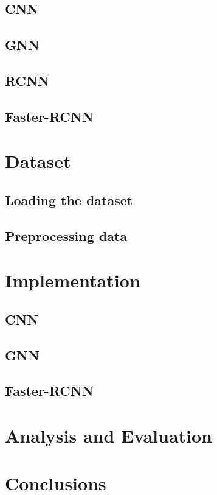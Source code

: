 \documentclass[12pt]{article}
\begin{document}
\subsection{CNN}
\subsection{GNN}
\subsection{RCNN}
\subsection{Faster-RCNN}
    
\section{Dataset}
\subsection{Loading the dataset}
\subsection{Preprocessing data}

\section{Implementation}
\subsection{CNN}
\subsection{GNN}
\subsection{Faster-RCNN}

\section{Analysis and Evaluation}

\section{Conclusions}




\end{document}
